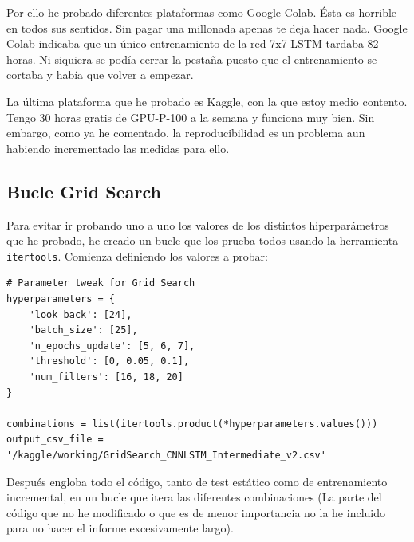 \documentclass{article}
\begin{document}
Por ello he probado diferentes plataformas como Google Colab. Ésta es horrible en todos sus sentidos. Sin pagar una millonada apenas te deja hacer nada. Google Colab indicaba que un único entrenamiento de la red 7x7 LSTM tardaba 82 horas. Ni siquiera se podía cerrar la pestaña puesto que el entrenamiento se cortaba y había que volver a empezar.

La última plataforma que he probado es Kaggle, con la que estoy medio contento. Tengo 30 horas gratis de GPU-P-100 a la semana y funciona muy bien. Sin embargo, como ya he comentado, la reproducibilidad es un problema aun habiendo incrementado las medidas para ello.


\subsection{Bucle Grid Search}
Para evitar ir probando uno a uno los valores de los distintos hiperparámetros que he probado, he creado un bucle que los prueba todos usando la herramienta \texttt{itertools}. Comienza definiendo los valores a probar:

\begin{lstlisting}[style=pythonstyle, caption={Hiperparámetros con \texttt{itertools}}]
# Parameter tweak for Grid Search
hyperparameters = {
    'look_back': [24],
    'batch_size': [25],
    'n_epochs_update': [5, 6, 7],
    'threshold': [0, 0.05, 0.1],
    'num_filters': [16, 18, 20]
}

combinations = list(itertools.product(*hyperparameters.values()))
output_csv_file = '/kaggle/working/GridSearch_CNNLSTM_Intermediate_v2.csv'
\end{lstlisting}

Después engloba todo el código, tanto de test estático como de entrenamiento incremental, en un bucle que itera las diferentes combinaciones (La parte del código que no he modificado o que es de menor importancia no la he incluido para no hacer el informe excesivamente largo).
\end{document}
